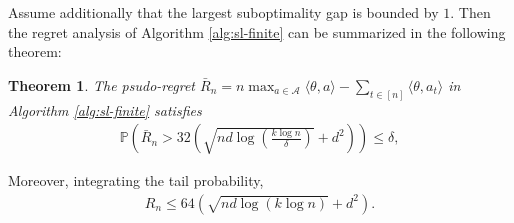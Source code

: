 \documentclass[10pt,a4paper]{amsart}
\numberwithin{equation}{section}
\theoremstyle{plain}
\newtheorem{Th}{Theorem}
\theoremstyle{definition}
\def\P{{\mathbb P}}
\def\t{{\theta}}
\begin{document}
Assume additionally that the largest suboptimality gap is bounded by $1$. Then the regret analysis of Algorithm \ref{alg:sl-finite} can be summarized in the following theorem:

\begin{Th}\label{sl:finite}
The psudo-regret $\bar{R}_n=n\max_{a\in\mathcal A}\langle\t, a\rangle-\sum_{t\in [n]}\langle\t, a_t\rangle$ in Algorithm \ref{alg:sl-finite} satisfies
\begin{align*}
\P\left(\bar{R}_n> 32\left(\sqrt{nd\log\left(\frac{k\log n}{\delta}\right)}+d^2\right)\right)\leq \delta, 
\end{align*}
\end{Th}
Moreover, integrating the tail probability,
\begin{align*}
R_n\leq 64(\sqrt{nd\log (k\log n)}+d^2). 
\end{align*}
\end{document}
